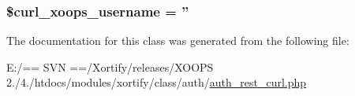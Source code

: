 \hypertarget{class_xortify_auth_rest___curl_aab7480ba9f878a02b2c9fd43922fa070}{
\subsubsection[{\$curl\-\_\-xoops\-\_\-username}]{\setlength{\rightskip}{0pt plus 5cm}\$curl\-\_\-xoops\-\_\-username = ''}}\label{class_xortify_auth_rest___curl_aab7480ba9f878a02b2c9fd43922fa070}


The documentation for this class was generated from the following file\-:\begin{DoxyCompactItemize}
\item 
E\-:/== S\-V\-N ==/\-Xortify/releases/\-X\-O\-O\-P\-S 2./4./htdocs/modules/xortify/class/auth/\hyperlink{auth__rest__curl_8php}{auth\-\_\-rest\-\_\-curl.\-php}\end{DoxyCompactItemize}
